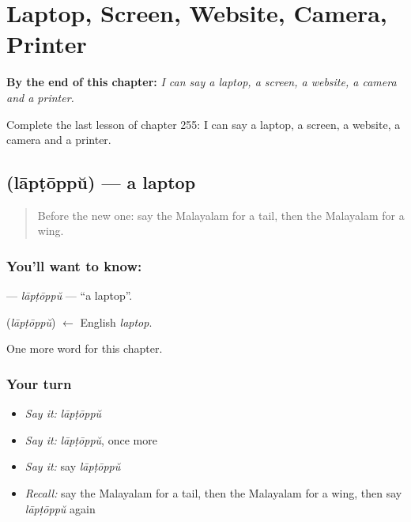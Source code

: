 
\chapter{Laptop, Screen, Website, Camera, Printer}
\label{ch:ml-laptop-screen-website-camera-printer}

\begin{chapteropening}
\textbf{By the end of this chapter:} \emph{I can say a laptop, a screen, a website, a camera and a printer.}

Complete the last lesson of chapter 255: I can say a laptop, a screen, a website, a camera and a printer.
\end{chapteropening}

\section[\texorpdfstring{\ml{ലാപ്ടോപ്പ്} (lāpṭōppŭ)}{ലാപ്ടോപ്പ് (lāpṭōppŭ)}]{ (lāpṭōppŭ) — a laptop}

\label{lesson:ML-C255-laptoppu}



\begin{quote}
Before the new one: say the Malayalam for a tail, then the Malayalam for a wing.
\end{quote}

\subsection*{You'll want to know: }
\textbf{} — \emph{lāpṭōppŭ} — \textquotedblleft{}a laptop\textquotedblright{}.

\begin{cousinweb}
\textbf{} (\emph{lāpṭōppŭ}) $\leftarrow$ English \emph{laptop}.
\end{cousinweb}

\begin{grammarlens}[title={What you've built}]
One more word for this chapter.
\end{grammarlens}

\subsection*{Your turn}
\begin{itemize}
\raggedright
  \item \emph{Say it:} \emph{lāpṭōppŭ}
  \item \emph{Say it:} \emph{lāpṭōppŭ}, once more
  \item \emph{Say it:} say \emph{lāpṭōppŭ}
  \item \emph{Recall:} say the Malayalam for a tail, then the Malayalam for a wing, then say \emph{lāpṭōppŭ} again
\end{itemize}

